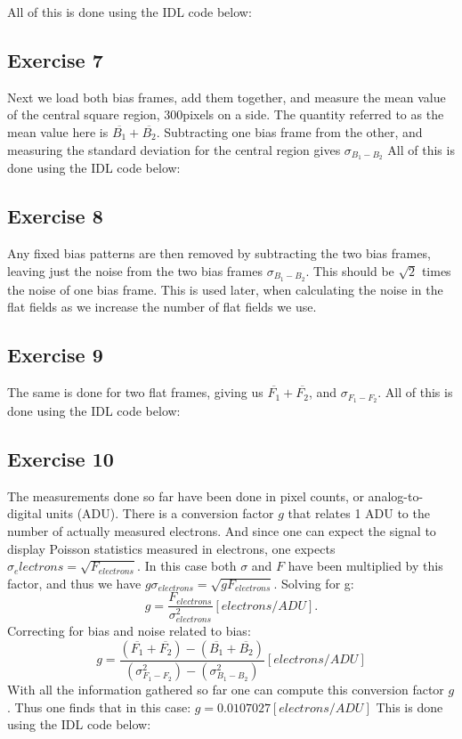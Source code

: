 \documentclass[a4paper,12pt]{article}
\begin{document}
All of this is done using the IDL code below:  


\subsection{Exercise 7}
Next we load both bias frames, add them together, and measure the mean value of the central square region, 300pixels on a side. The quantity referred to as the mean value here is $\overline{B_1} + \overline{B_2}$. Subtracting one bias frame from the other, and measuring the standard deviation for the central region gives $\sigma_{B_1-B_2}$
All of this is done using the IDL code below: 

\subsection{Exercise 8}
Any fixed bias patterns are then removed by subtracting the two bias frames, leaving just the noise from the two bias frames $\sigma_{B_1-B_2}$. This should be $\sqrt{2}$ times the noise of one bias frame. This is used later, when calculating the noise in the flat fields as we increase the number of flat fields we use.
\subsection{Exercise 9}
The same is done for two flat frames, giving us $\overline{F_1} + \overline{F_2}$, and $\sigma_{F_1-F_2}$. All of this is done using the IDL code below: 

\subsection{Exercise 10}
The measurements done so far have been done in pixel counts, or analog-to-digital units (ADU). There is a conversion factor $g$ that relates 1 ADU to the number of actually measured electrons. And since one can expect the signal to display Poisson statistics measured in electrons, one expects $\sigma_electrons = \sqrt{F_{electrons}}$. In this case both $\sigma$ and $F$ have been multiplied by this factor, and thus we have $g\sigma_{electrons} = \sqrt{gF_{electrons}}$.
Solving for g:
\begin{equation}
g = \frac{F_{electrons}}{\sigma_{electrons}^2} [electrons/ADU].
\end{equation}
Correcting for bias and noise related to bias:
\begin{equation}
g = \frac{(\overline{F_1}+\overline{F_2})-(\overline{B_1}+\overline{B_2})} {(\sigma_{F_1-F_2}^2)-(\sigma_{B_1-B_2}^2)} [electrons/ADU]
\end{equation}
With all the information gathered so far one can compute this conversion factor $g$. Thus one finds that in this case: $ g = 0.0107027 [electrons/ADU]$
This is done using the IDL code below: 

\end{document}
